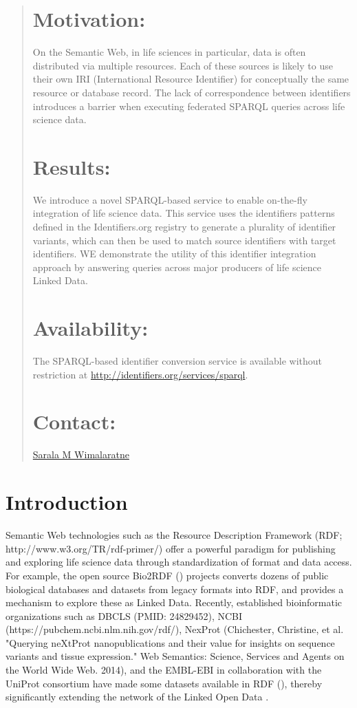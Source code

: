 \documentclass{bioinfo}
\begin{document}
\begin{abstract}
\section{Motivation:}
On the Semantic Web, in life sciences in particular, data is often distributed via multiple resources. Each of these sources is likely to use their own IRI (International Resource Identifier) for conceptually the same resource or database record. The lack of correspondence between identifiers introduces a barrier when executing federated SPARQL queries across life science data.

\section{Results:}
We introduce a novel SPARQL-based service to enable on-the-fly integration of life science data. This service uses the identifiers patterns defined in the Identifiers.org registry to generate a plurality of identifier variants, which can then be used to match source identifiers with target identifiers. WE demonstrate the utility of this identifier integration approach by answering queries across major producers of life science Linked Data.

\section{Availability:}
The SPARQL-based identifier conversion service is available without restriction at \linebreak\href{http://identifiers.org/services/sparql}{http://identifiers.org/services/sparql}.

\section{Contact:} \href{sarala@ebi.ac.uk}{Sarala M Wimalaratne}
\end{abstract}

\section{Introduction}
Semantic Web technologies such as the Resource Description Framework (RDF; http://www.w3.org/TR/rdf-primer/) offer a powerful paradigm for publishing and exploring life science data through standardization of format and data access. For example, the open source Bio2RDF (\cite{Biordf2}) projects converts dozens of public biological databases and datasets from legacy formats into RDF, and provides a mechanism to explore these as Linked Data. Recently, established bioinformatic organizations such as DBCLS (PMID: 24829452), NCBI (https://pubchem.ncbi.nlm.nih.gov/rdf/), NexProt (Chichester, Christine, et al. "Querying neXtProt nanopublications and their value for insights on sequence variants and tissue expression." Web Semantics: Science, Services and Agents on the World Wide Web. 2014), and the EMBL-EBI in collaboration with the UniProt consortium have made some datasets available in RDF (\cite{Jupp01052014}), thereby significantly extending the network of the Linked Open Data .
\end{document}
